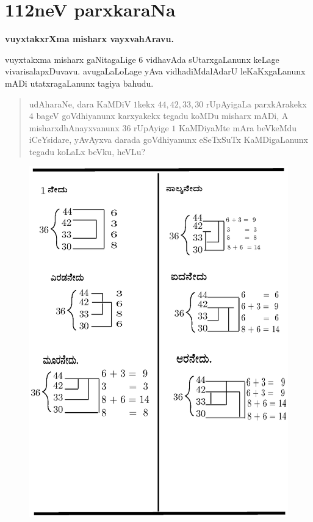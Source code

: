 \chapter{112neV parxkaraNa}

\begin{center}
{\bf\large vuyxtakxrXma misharx vayxvahAravu.}
\end{center}

vuyxtakxma misharx gaNitagaLige $6$ vidhavAda sUtarxgaLanunx keLage vivarisalapxDuvavu. avugaLaLoLage yAva vidhadiMdalAdarU leKaKxgaLanunx mADi utatxragaLanunx tagiya bahudu.

\begin{verse}
udAharaNe, dara KaMDiV $1$kekx $44, 42, 33, 30$ rUpAyigaLa parxkArakekx $4$ bageV goVdhiyanunx karxyakekx  tegadu koMDu misharx mADi, A misharxdhAnayxvanunx $36$ rUpAyige $1$ KaMDiyaMte mAra beVkeMdu iCeYsidare, yAvAyxva darada goVdhiyanunx eSeTxSuTx KaMDigaLanunx tegadu koLaLx beVku, heVLu?
\end{verse}

\begin{figure}[H]
\centering
\includegraphics{7.eps}
\end{figure}


